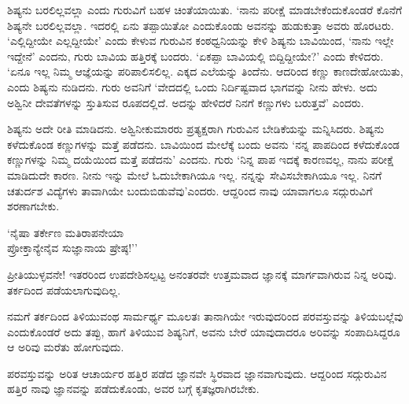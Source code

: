  ಶಿಷ್ಯನು ಬರಲಿಲ್ಲವಲ್ಲಾ ಎಂದು ಗುರುವಿಗೆ ಬಹಳ ಚಿಂತೆಯಾಯಿತು. `ನಾನು ಪರೀಕ್ಷೆ ಮಾಡಬೇಕೆಂದುಕೊಂಡರೆ ಕೊನೆಗೆ ಶಿಷ್ಯನೇ ಬರಲಿಲ್ಲವಲ್ಲಾ. ಇದರಲ್ಲಿ ಏನು ತಪ್ಪಾಯಿತೋ ಎಂದುಕೊಂಡು ಅವನನ್ನು ಹುಡುಕುತ್ತಾ ಅವರು ಹೊರಟರು. `ಎಲ್ಲಿದ್ದೀಯೇ ಎಲ್ಲದ್ದೀಯೇ' ಎಂದು ಕೇಳುವ ಗುರುವಿನ ಕಂಠಧ್ವನಿಯನ್ನು ಕೇಳಿ ಶಿಷ್ಯನು ಬಾವಿಯಿಂದ, `ನಾನು ಇಲ್ಲೇ ಇದ್ದೇನೆ' ಎಂದನು, ಗುರು ಬಾವಿಯ ಹತ್ತಿರಕ್ಕೆ ಬಂದರು. `ಏಕಪ್ಪಾ ಬಾವಿಯಲ್ಲಿ ಬಿದ್ದಿದ್ದೀಯೇ?' ಎಂದು ಕೇಳಿದರು. `ಏನೂ ಇಲ್ಲ ನಿಮ್ಮ ಆಜ್ಞೆಯನ್ನು ಪರಿಪಾಲಿಸಲಿಲ್ಲ. ಎಕ್ಕದ ಎಲೆಯನ್ನು ತಿಂದೆನು. ಆದರಿಂದ ಕಣ್ಣು ಕಾಣದೇಹೋಯಿತು, ಎಂದು ಶಿಷ್ಯನು ನುಡಿದನು. ಗುರು ಅವನಿಗೆ `ವೇದದಲ್ಲಿ ಒಂದು  ನಿರ್ದಿಷ್ಟವಾದ ಭಾಗವನ್ನು ನೀನು ಹೇಳು. ಅದು ಅಶ್ವಿನೀ ದೇವತೆಗಳನ್ನು ಸ್ತುತಿಸುವ ರೂಪದಲ್ಲಿದೆ. ಅದನ್ನು ಹೇಳಿದರೆ ನಿನಗೆ ಕಣ್ಣುಗಳು ಬರುತ್ತವೆ' ಎಂದರು. 
 
 ಶಿಷ್ಯನು ಅದೇ ರೀತಿ ಮಾಡಿದನು.  ಅಶ್ವಿನೀಕುಮಾರರು ಪ್ರತ್ಯಕ್ಷರಾಗಿ ಗುರುವಿನ ಬೇಡಿಕೆಯನ್ನು  ಮನ್ನಿಸಿದರು. ಶಿಷ್ಯನು ಕಳೆದುಕೊಂಡ ಕಣ್ಣುಗಳನ್ನು ಮತ್ತೆ ಪಡೆದನು. ಬಾವಿಯಿಂದ ಮೇಲೆಕ್ಕೆ ಬಂದು ಅವನು `ನನ್ನ ಪಾಪದಿಂದ ಕಳೆದುಕೊಂಡ ಕಣ್ಣುಗಳನ್ನು ನಿಮ್ಮ ದಯೆಯಿಂದ ಮತ್ತೆ  ಪಡೆದನು' ಎಂದನು. ಗುರು `ನಿನ್ನ ಪಾಪ ಇದಕ್ಕೆ ಕಾರಣವಲ್ಲ, ನಾನು ಪರೀಕ್ಷೆ ಮಾಡಿದುದೇ ಕಾರಣ. ನೀನು ಇನ್ನು ಮೇಲೆ ಓದುಬೇಕಾಗಿಯೂ ಇಲ್ಲ. ನನ್ನನ್ನು ಸೇವಿಸಬೇಕಾಗಿಯೂ ಇಲ್ಲ. ನಿನಗೆ ಚತುರ್ದಶ  ವಿದ್ಯೆಗಳು ತಾವಾಗಿಯೇ  ಬಂದುಬಿಡುವೆವು'ಎಂದರು. ಆದ್ದರಿಂದ ನಾವು ಯಾವಾಗಲೂ ಸದ್ಗುರುವಿಗೆ ಶರಣಾಗಬೇಕು.
 
 \begin{shloka}
 `ನೈಷಾ ತರ್ಕೇಣ ಮತಿರಾಪನೇಯಾ\\
 ಪ್ರೋಕ್ತಾನ್ಯೇನೈವ ಸುಜ್ಞಾನಾಯ ಷ್ರೇಷ್ಠ!''
 \end{shloka}
 
 
 ಪ್ರೀತಿಯುಳ್ಳವನೇ! ಇತರರಿಂದ ಉಪದೇಶಿಸಲ್ಪಟ್ಟ ಅನಂತರವೇ ಉತ್ತಮವಾದ ಜ್ಞಾನಕ್ಕೆ ಮಾರ್ಗವಾಗಿರುವ ನಿನ್ನ ಅರಿವು. ತರ್ಕದಿಂದ ಪಡೆಯಲಾಗುವುದಿಲ್ಲ.
 
 ನಮಗೆ ತರ್ಕದಿಂದ ತಿಳಿಯುವಂಥ ಸಾರ್ಮರ್ಥ್ಯ ಮೂಲತಃ ತಾನಾಗಿಯೇ ಇರುವುದರಿಂದ ಪರವಸ್ತುವನ್ನು ತಿಳಿಯಬಲ್ಲೆವು ಎಂದುಕೊಂಡರೆ ಅದು ತಪ್ಪು, ಹಾಗೆ ತಿಳಿಯುವ ಶಿಷ್ಯನಿಗೆ, ಅವನು ಬೇರೆ ಯಾವುದಾದರೂ ಅರಿವನ್ನು ಸಂಪಾದಿಸಿದ್ದರೂ ಆ ಅರಿವು ಮರೆತು ಹೋಗುವುದು. 
 
 ಪರವಸ್ತುವನ್ನು ಅರಿತ ಆಚಾರ್ಯರ ಹತ್ತಿರ ಪಡೆದ ಜ್ಞಾನವೇ ಸ್ಥಿರವಾದ ಜ್ಞಾನವಾಗುವುದು.  ಆದ್ದರಿಂದ ಸದ್ಗುರುವಿನ  ಹತ್ತಿರ ನಾವು ಜ್ಞಾನವನ್ನು ಪಡೆದುಕೊಂಡು, ಅವರ ಬಗ್ಗೆ  ಕೃತಜ್ಞರಾಗಿರಬೇಕು.
 
  


